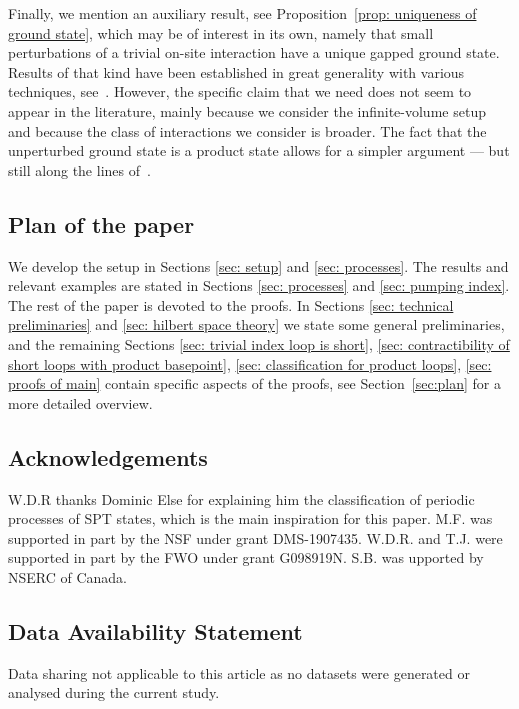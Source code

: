 Finally, we mention an auxiliary result, see Proposition~\ref{prop: uniqueness of ground state}, which may be of interest in its own, namely that small perturbations of a trivial on-site interaction have a unique gapped ground state. Results of that kind have been established in great generality with various techniques, see~\cite{yarotsky2006ground,bravyi2010topological,michalakis2013stability,nachtergaele2020quasi,del2021lie}. However, the specific claim that we need does not seem to appear in the literature, mainly because we consider the infinite-volume setup and because the class of interactions we consider is broader. The fact that the unperturbed ground state is a product state allows for a simpler argument --- but still along the lines of~\cite{michalakis2013stability}.

%
%
%
\subsection*{Plan of the paper} We develop the setup in Sections \ref{sec: setup} and \ref{sec: processes}. The results and relevant examples are stated in Sections \ref{sec: processes} and \ref{sec: pumping index}.  The rest of the paper is devoted to the proofs. In Sections \ref{sec: technical preliminaries} and \ref{sec: hilbert space theory} we state some general preliminaries, and the remaining Sections \ref{sec: trivial index loop is short}, \ref{sec: contractibility of short loops with product basepoint}, \ref{sec: classification for product loops}, \ref{sec: proofs of main} contain specific aspects of the proofs, see Section~\ref{sec:plan} for a more detailed overview.



\subsection*{Acknowledgements}
W.D.R thanks Dominic Else for explaining him the classification of periodic processes of SPT states, which is the main inspiration for this paper.    M.F. was supported in part by the NSF under grant DMS-1907435. W.D.R. and T.J. were supported in part by the FWO under grant G098919N. S.B. was upported by NSERC of Canada.

\subsection*{Data Availability Statement} Data sharing not applicable to this article as no datasets were generated or analysed during the current study.

